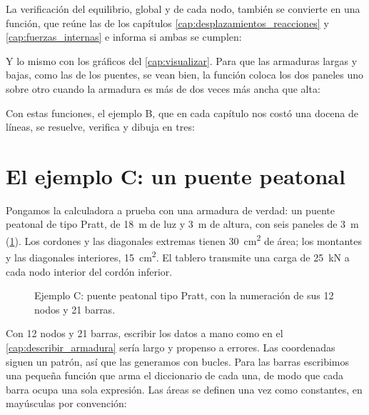
La verificación del equilibrio, global y de cada nodo, también se convierte
en una función, que reúne las de los capítulos \ref{cap:desplazamientos_reacciones}
y \ref{cap:fuerzas_internas} e informa si ambas se cumplen:

Y lo mismo con los gráficos del \cref{cap:visualizar}. Para que las armaduras
largas y bajas, como las de los puentes, se vean bien, la función coloca los
dos paneles uno sobre otro cuando la armadura es más de dos veces más ancha
que alta:

Con estas funciones, el ejemplo B, que en cada capítulo nos costó una docena
de líneas, se resuelve, verifica y dibuja en tres:

\section{El ejemplo C: un puente peatonal}\label{sec:ejemplo_c}

Pongamos la calculadora a prueba con una armadura de verdad: un puente
peatonal de tipo Pratt, de \SI{18}{\metre} de luz y \SI{3}{\metre} de altura,
con seis paneles de \SI{3}{\metre} (\cref{fig:ejemplo_c}). Los cordones y las
diagonales extremas tienen \SI{30}{\centi\metre\squared} de área; los
montantes y las diagonales interiores, \SI{15}{\centi\metre\squared}. El
tablero transmite una carga de \SI{25}{\kilo\newton} a cada nodo interior del
cordón inferior.

\begin{figure}[ht]
  \centering
  \caption{Ejemplo C: puente peatonal tipo Pratt, con la numeración de sus 12
    nodos y 21 barras.}
  \label{fig:ejemplo_c}
\end{figure}

Con 12 nodos y 21 barras, escribir los datos a mano como en el
\cref{cap:describir_armadura} sería largo y propenso a errores. Las
coordenadas siguen un patrón, así que las generamos con bucles. Para las
barras escribimos una pequeña función que arma el diccionario de cada una,
de modo que cada barra ocupa una sola expresión. Las áreas se definen una vez
como constantes, en mayúsculas por convención:

